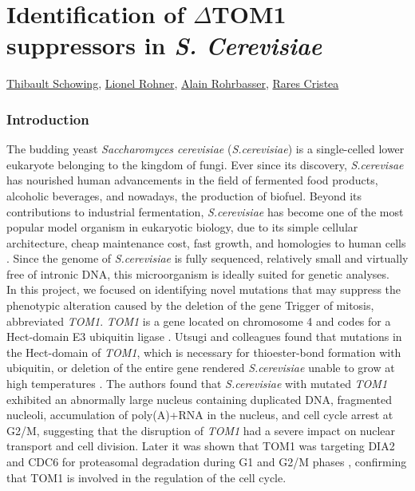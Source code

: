 \documentclass[10pt,a4paper]{article}
\begin{document}
\part*{\Large Identification of $\Delta$TOM1 suppressors in \textit{S. Cerevisiae}}

\href{mailto:thibault.schowing@unifr.ch}{Thibault Schowing}, \href{mailto:lio_roh@students.unibe.ch}{Lionel Rohner},
\href{mailto:alain.rohrbasser.unifr.ch}{Alain Rohrbasser},
\href{mailto:rares.cristea@unifr.ch}{Rares Cristea}\\

\section*{\large Introduction}


The budding yeast \textit{Saccharomyces cerevisiae} (\textit{S.cerevisiae}) is a single-celled lower eukaryote belonging to the kingdom of fungi. Ever since its discovery, \textit{S.cerevisae} has nourished human advancements in the field of fermented food products, alcoholic beverages, and nowadays, the production of biofuel. Beyond its contributions to industrial fermentation, \textit{S.cerevisiae} has become one of the most popular model organism in eukaryotic biology, due to its simple cellular architecture, cheap maintenance cost, fast growth, and homologies to human cells \cite{botstein_yeast_2011}. Since the genome of \textit{S.cerevisiae} is fully sequenced, relatively small and virtually free of intronic DNA, this microorganism is ideally suited for genetic analyses.\\

\noindent In this project, we focused on identifying novel mutations that may suppress the phenotypic alteration caused by the deletion of the gene Trigger of mitosis, abbreviated \textit{TOM1}. \textit{TOM1} is a gene located on chromosome 4 and codes for a Hect-domain E3 ubiquitin ligase \cite{utsugi_yeast_1999}. Utsugi and colleagues found that mutations in the Hect-domain of \textit{TOM1}, which is necessary for thioester-bond formation with ubiquitin, or deletion of the entire gene rendered \textit{S.cerevisiae} unable to grow at high temperatures \cite{utsugi_yeast_1999}. The authors found that \textit{S.cerevisiae} with mutated \textit{TOM1} exhibited an abnormally large nucleus containing duplicated DNA, fragmented nucleoli, accumulation of poly(A)+RNA in the nucleus, and cell cycle arrest at G2/M, suggesting that the disruption of \textit{TOM1} had a severe impact on nuclear transport and cell division. Later it was shown that TOM1 was targeting DIA2 and CDC6 for proteasomal degradation during G1 and G2/M phases \cite{kim_hect_2012}, confirming that TOM1 is involved in the regulation of the cell cycle.\\
\end{document}
